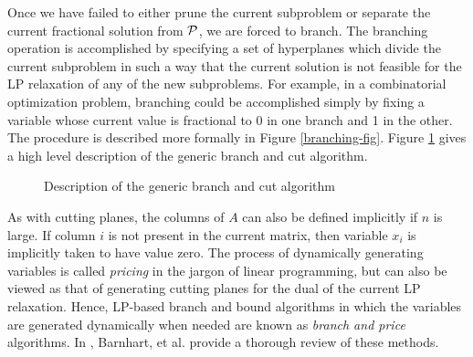 \indent Once we have failed to either prune the current subproblem or separate
the current fractional solution from ${\cal P}$, we are forced to
branch. The branching operation is accomplished by specifying a set of
hyperplanes which divide the current subproblem in such a way that the
current solution is not feasible for the LP relaxation of any of the
new subproblems. For example, in a combinatorial optimization problem,
branching could be accomplished simply by fixing a variable whose
current value is fractional to 0 in one branch and 1
in the other. The procedure is described more formally in Figure
\ref{branching-fig}. Figure \ref{gb&c} gives a high level description
of the generic branch and cut algorithm.
\begin{figure}
\caption{Description of the generic branch and cut algorithm}
\label{gb&c}
\end{figure}

As with cutting planes, the columns of $A$ can also be defined
implicitly if $n$ is large. If column $i$ is not present in the
current matrix, then variable $x_i$ is implicitly taken to have value
zero. The process of dynamically generating variables is called {\em
pricing} in the jargon of linear programming, but can also be viewed
as that of generating cutting planes for the dual of the current
LP relaxation. Hence, LP-based branch and bound algorithms in which
the variables are generated dynamically when needed are known as {\em
branch and price} algorithms. In \cite{B&PII}, Barnhart,
et al. provide a thorough review of these methods. 

